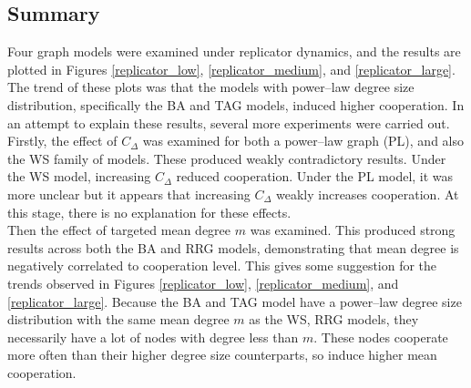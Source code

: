 \subsection{Summary}
Four graph models were examined under replicator dynamics, and the results are plotted in Figures \ref{replicator_low}, \ref{replicator_medium}, and \ref{replicator_large}. The trend of these plots was that the models with power--law degree size distribution, specifically the BA and TAG models, induced higher cooperation. In an attempt to explain these results, several more experiments were carried out. \\

Firstly, the effect of $C_\Delta$ was examined for both a power--law graph (PL), and also the WS family of models. These produced weakly contradictory results. Under the WS model, increasing $C_\Delta$ reduced cooperation. Under the PL model, it was more unclear but it appears that increasing $C_\Delta$ weakly increases cooperation. At this stage, there is no explanation for these effects. \\

Then the effect of targeted mean degree $m$ was examined. This produced strong results across both the BA and RRG models, demonstrating that mean degree is negatively correlated to cooperation level. This gives some suggestion for the trends observed in Figures \ref{replicator_low}, \ref{replicator_medium}, and \ref{replicator_large}. Because the BA and TAG model have a power--law degree size distribution with the same mean degree $m$ as the WS, RRG models, they necessarily have a lot of nodes with degree less than $m$. These nodes cooperate more often than their higher degree size counterparts, so induce higher mean cooperation. 

